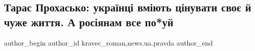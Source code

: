  
 
 
 
 
 
\subsection{Тарас Прохасько: українці вміють цінувати своє й чуже життя. А росіянам все по*уй}
\label{sec:28_04_2022.stz.news.ua.pravda.1.prohasjko_rossiane_pohuj}
 
\ifcmt
 author_begin
   author_id kravec_roman,news.ua.pravda
 author_end
\fi
